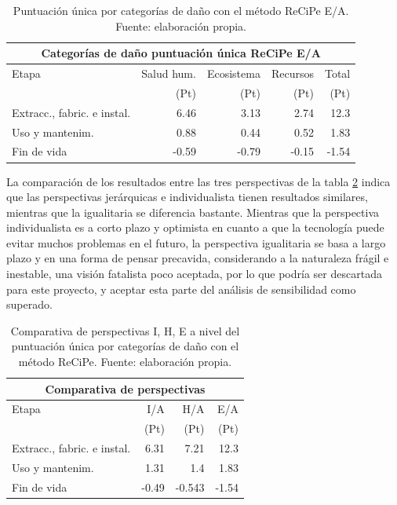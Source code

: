 \begin{table}[!htb]
\centering
\begin{tabular}{p{6cm}rrrr}
\toprule
\multicolumn{5}{c}{Categorías de daño puntuación única ReCiPe E/A}\\
\midrule
Etapa & Salud hum. & Ecosistema & Recursos & Total\\
 & (Pt) & (Pt) & (Pt) & (Pt)\\
\midrule
Extracc., fabric. e instal. & 6.46 & 3.13 & 2.74 & 12.3\\
Uso y mantenim. & 0.88 & 0.44 & 0.52 & 1.83\\
Fin de vida & -0.59 & -0.79 & -0.15 & -1.54\\
\bottomrule
\end{tabular}
\caption[Puntuación única por categorías de daño con el método ReCiPe E/A.]{Puntuación única por categorías de daño con el método ReCiPe E/A. Fuente: elaboración propia.}
\label{sensibilidad_ea_puntuacionunica}
\end{table}

La comparación de los resultados entre las tres perspectivas de la tabla \ref{comparativa_perspectivas} indica que las perspectivas jerárquicas e individualista tienen resultados similares, mientras que la igualitaria se diferencia bastante. Mientras que la perspectiva individualista es a corto plazo y optimista en cuanto a que la tecnología puede evitar muchos problemas en el futuro, la perspectiva igualitaria se basa a largo plazo y en una forma de pensar precavida, considerando a la naturaleza frágil e inestable, una visión fatalista poco aceptada, por lo que podría ser descartada para este proyecto, y aceptar esta parte del análisis de sensibilidad como superado.

\begin{table}[!htb]
\centering
\begin{tabular}{p{6cm}rrr}
\toprule
\multicolumn{4}{c}{Comparativa de perspectivas}\\
\midrule
Etapa & I/A & H/A & E/A\\
 & (Pt) & (Pt) & (Pt)\\
\midrule
Extracc., fabric. e instal. & 6.31 & 7.21 & 12.3\\
Uso y mantenim. & 1.31 & 1.4 & 1.83\\
Fin de vida & -0.49 & -0.543 & -1.54\\
\bottomrule
\end{tabular}
\caption[Comparativa de perspectivas I, H, E a nivel del puntuación única por categorías de daño con el método ReCiPe.]{Comparativa de perspectivas I, H, E a nivel del puntuación única por categorías de daño con el método ReCiPe. Fuente: elaboración propia.}
\label{comparativa_perspectivas}
\end{table}

